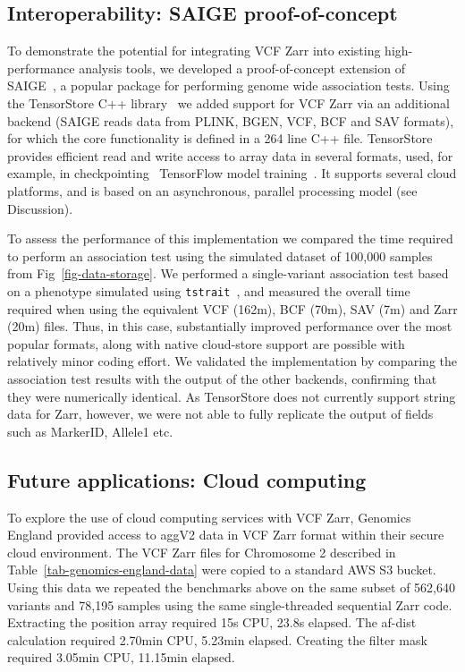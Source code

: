 \documentclass[a4paper,num-refs]{oup-contemporary}
\begin{document}
\subsection{Interoperability: SAIGE proof-of-concept}
To demonstrate the potential for integrating VCF Zarr into existing
high-performance analysis tools,
we developed a proof-of-concept extension of SAIGE~\cite{zhou2018efficiently,
zhou2020scalable}, a popular package for performing genome wide
association tests. 
Using the TensorStore C++ library~\cite{tensorstore}
we added support for VCF Zarr via an additional backend 
(SAIGE reads data from PLINK, BGEN, VCF, BCF and SAV formats),
for which the core functionality is defined in a 264 line C++ file.
TensorStore provides efficient read and write access to array
data in several formats, used, for example, in
checkpointing~\cite{orbax-tensorstore} 
TensorFlow model training~\citep{tensorflow2015-whitepaper}.
It supports several cloud platforms, and is based on an
asynchronous, parallel processing model (see Discussion).

To assess the performance of this implementation we compared the time required
to perform an association test using the simulated dataset of 100,000 samples
from Fig~\ref{fig-data-storage}. 
We performed a single-variant association
test based on a phenotype simulated using
\texttt{tstrait}~\citep{tagami2024tstrait},
and measured the overall time required when using the 
equivalent VCF (162m), BCF (70m), SAV (7m) and Zarr (20m) files.
Thus, in this case, substantially improved performance over the 
most popular formats, along with native cloud-store support are 
possible with relatively minor coding effort.
We validated the implementation by comparing the association
test results with the output of the other backends,
confirming that they were numerically identical. 
As TensorStore does not currently support string data for Zarr, 
however,
we were not able to fully replicate the output of fields 
such as MarkerID, Allele1 etc.



\subsection{Future applications: Cloud computing}
To explore the use of cloud computing services with VCF Zarr,
Genomics England provided access to aggV2 data 
in VCF Zarr format within their secure
cloud environment. The VCF Zarr files for Chromosome 2
described in Table~\ref{tab-genomics-england-data}
were copied to a standard AWS S3 bucket.
Using this data we repeated the benchmarks above on the same subset
of 562,640 variants and 78,195 samples using the same
single-threaded sequential Zarr code.
Extracting the position array required 15s CPU, 23.8s elapsed.
The af-dist calculation required 2.70min CPU, 5.23min elapsed.
Creating the filter mask required 3.05min CPU, 11.15min elapsed.
\end{document}
